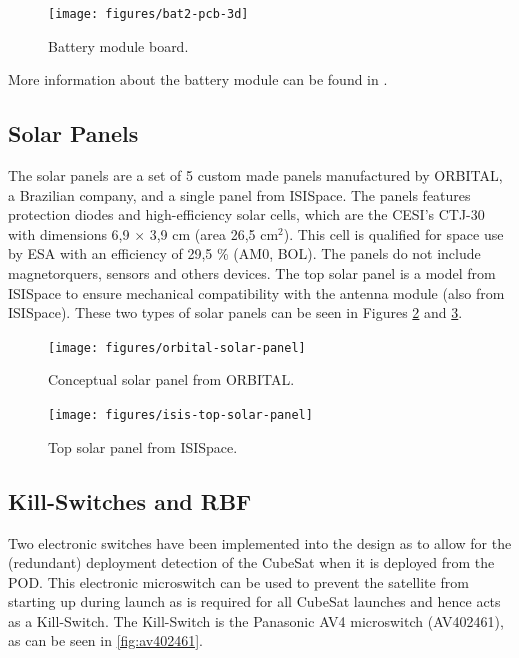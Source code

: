 \begin{figure}[!ht]
    \begin{center}
        \texttt{[image: figures/bat2-pcb-3d]}
        \caption{Battery module board.}
        \label{fig:battery-module-board}
    \end{center}
\end{figure}

More information about the battery module can be found in \cite{bat4c}.

\subsection{Solar Panels}

The solar panels are a set of 5 custom made panels manufactured by ORBITAL, a Brazilian company, and a single panel from ISISpace. The panels features protection diodes and high-efficiency solar cells, which are the CESI's CTJ-30 \cite{ctj30} with dimensions 6,9 $\times$ 3,9 cm (area 26,5 cm$^{2}$). This cell is qualified for space use by ESA with an efficiency of 29,5 \% (AM0, BOL). The panels do not include magnetorquers, sensors and others devices. The top solar panel is a model from ISISpace to ensure mechanical compatibility with the antenna module (also from ISISpace). These two types of solar panels can be seen in Figures \ref{fig:solar-panel-orbital} and \ref{fig:top-solar-panel}.

\begin{figure}[!ht]
    \begin{center}
        \texttt{[image: figures/orbital-solar-panel]}
        \caption{Conceptual solar panel from ORBITAL.}
        \label{fig:solar-panel-orbital}
    \end{center}
\end{figure}

\begin{figure}[!ht]
    \begin{center}
        \texttt{[image: figures/isis-top-solar-panel]}
        \caption{Top solar panel from ISISpace.}
        \label{fig:top-solar-panel}
    \end{center}
\end{figure}

\subsection{Kill-Switches and RBF}

Two electronic switches have been implemented into the design as to allow for the (redundant) deployment detection of the CubeSat when it is deployed from the POD. This electronic microswitch can be used to prevent the satellite from starting up during launch as is required for all CubeSat launches and hence acts as a Kill-Switch. The Kill-Switch is the Panasonic AV4 microswitch (AV402461), as can be seen in \autoref{fig:av402461}.

